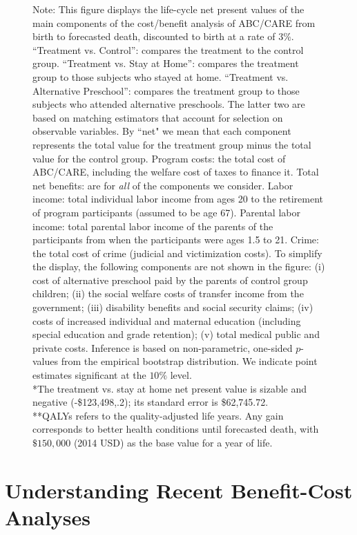 \begin{figure}
Note: This figure displays the life-cycle net present values of the main components of the cost/benefit analysis of ABC/CARE from birth to forecasted death, discounted to birth at a rate of 3\%. ``Treatment vs. Control'': compares the treatment to the control group. ``Treatment vs. Stay at Home'': compares the treatment group to those subjects who stayed at home. ``Treatment vs. Alternative Preschool'': compares the treatment group to those subjects who attended alternative preschools. The latter two are based on matching estimators that account for selection on observable variables. By ``net" we mean that each component represents the total value for the treatment group minus the total value for the control group. Program costs: the total cost of ABC/CARE, including the welfare cost of taxes to finance it. Total net benefits: are for \textit{all} of the components we consider. Labor income: total individual labor income from ages 20 to the retirement of program participants (assumed to be age 67). Parental labor income: total parental labor income of the parents of the participants from when the participants were ages 1.5 to 21. Crime: the total cost of crime (judicial and victimization costs). To simplify the display, the following components are not shown in the figure: (i) cost of alternative preschool paid by the parents of control group children; (ii) the social welfare costs of transfer income from the government; (iii) disability benefits and social security claims; (iv) costs of increased individual and maternal education (including special education and grade retention); (v) total medical public and private costs. Inference is based on non-parametric, one-sided $p$-values from the empirical bootstrap distribution. We indicate point estimates significant at the $10\%$ level.\\
*The treatment vs. stay at home net present value is sizable and negative (-\$123,498,.2); its standard error is \$62,745.72.\\
**QALYs refers to the quality-adjusted life years. Any gain corresponds to better health conditions until forecasted death, with $\$150,000$ (2014 USD) as the base value for a year of life.\\
\end{figure}

\section{Understanding Recent Benefit-Cost Analyses} \label{section:bcaestimates}

